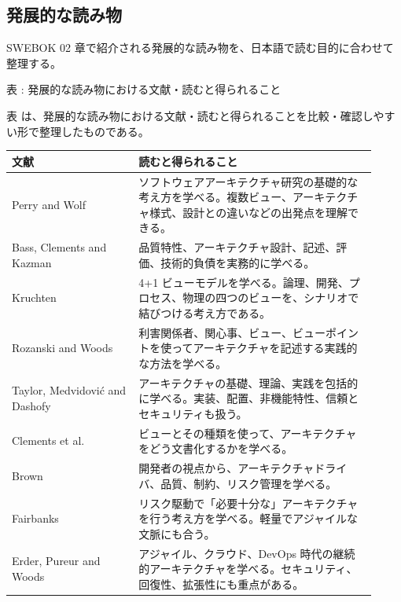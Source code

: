\subsection{発展的な読み物}
SWEBOK 02 章で紹介される発展的な読み物を、日本語で読む目的に合わせて整理する。

\par\smallskip\noindent{}\label{tab:ch02-08}表 \thetable: 発展的な読み物における文献・読むと得られること\par\smallskip
表 \thetable は、発展的な読み物における文献・読むと得られることを比較・確認しやすい形で整理したものである。\par\smallskip
\begin{longtable}{P{0.32\linewidth}P{0.60\linewidth}}
\toprule
文献 & 読むと得られること \\
\midrule
Perry and Wolf & ソフトウェアアーキテクチャ研究の基礎的な考え方を学べる。複数ビュー、アーキテクチャ様式、設計との違いなどの出発点を理解できる。 \\
Bass, Clements and Kazman & 品質特性、アーキテクチャ設計、記述、評価、技術的負債を実務的に学べる。 \\
Kruchten & 4+1 ビューモデルを学べる。論理、開発、プロセス、物理の四つのビューを、シナリオで結びつける考え方である。 \\
Rozanski and Woods & 利害関係者、関心事、ビュー、ビューポイントを使ってアーキテクチャを記述する実践的な方法を学べる。 \\
Taylor, Medvidović and Dashofy & アーキテクチャの基礎、理論、実践を包括的に学べる。実装、配置、非機能特性、信頼とセキュリティも扱う。 \\
Clements et al. & ビューとその種類を使って、アーキテクチャをどう文書化するかを学べる。 \\
Brown & 開発者の視点から、アーキテクチャドライバ、品質、制約、リスク管理を学べる。 \\
Fairbanks & リスク駆動で「必要十分な」アーキテクチャを行う考え方を学べる。軽量でアジャイルな文脈にも合う。 \\
Erder, Pureur and Woods & アジャイル、クラウド、DevOps 時代の継続的アーキテクチャを学べる。セキュリティ、回復性、拡張性にも重点がある。 \\
\bottomrule
\end{longtable}
